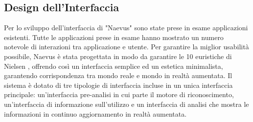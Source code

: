 {	\subsection {Design dell'Interfaccia}
Per lo sviluppo dell'interfaccia di "Naevus" sono state prese in esame applicazioni esistenti.
Tutte le applicazioni prese in esame hanno mostrato un numero notevole di interazioni tra applicazione e utente.
Per garantire la miglior usabilità possibile, Naevus è stata progettata in modo da garantire le  10 euristiche di Nielsen \cite{nielsen2005ten}, offrendo così un interfaccia semplice ed un estetica minimalista, garantendo corrispondenza tra mondo reale e mondo in realtà aumentata.
\newline
Il sistema è dotato di tre tipologie di interfaccia incluse in un unica interfaccia principale:
\newline
un'interfaccia pre-analisi in cui parte il motore di riconoscimento, un'interfaccia di informazione sull'utilizzo e un interfaccia di analisi che mostra le informazioni in continuo aggiornamento in realtà aumentata.
}
